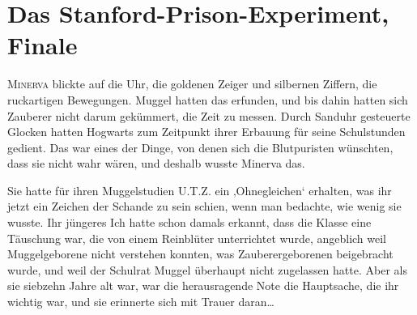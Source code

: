 \chapter{Das Stanford-Prison-Experiment, Finale}

\lettrine{M}{inerva} blickte auf die Uhr, die goldenen Zeiger und silbernen Ziffern, die ruckartigen Bewegungen. Muggel hatten das erfunden, und bis dahin hatten sich Zauberer nicht darum gekümmert, die Zeit zu messen. Durch Sanduhr gesteuerte Glocken hatten Hogwarts zum Zeitpunkt ihrer Erbauung für seine Schulstunden gedient. Das war eines der Dinge, von denen sich die Blutpuristen wünschten, dass sie nicht wahr wären, und deshalb wusste Minerva das.

Sie hatte für ihren Muggelstudien U.T.Z. ein ‚Ohnegleichen` erhalten, was ihr jetzt ein Zeichen der Schande zu sein schien, wenn man bedachte, wie wenig sie wusste.%
Ihr jüngeres Ich hatte schon damals erkannt, dass die Klasse eine Täuschung war, die von einem Reinblüter unterrichtet wurde, angeblich weil Muggelgeborene nicht verstehen konnten, was Zauberergeborenen beigebracht wurde, und weil der Schulrat Muggel überhaupt nicht zugelassen hatte. Aber als sie siebzehn Jahre alt war, war die herausragende Note die Hauptsache, die ihr wichtig war, und sie erinnerte sich mit Trauer daran…

